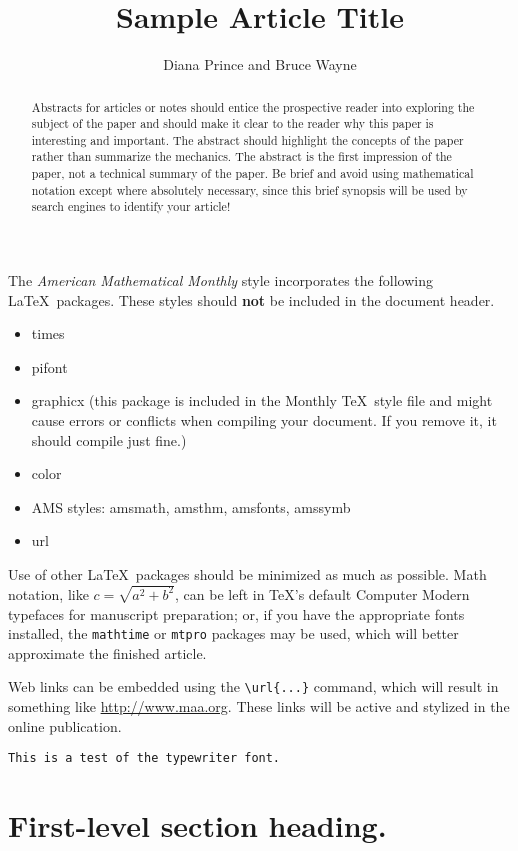 \documentclass{article}
\theoremstyle{plain}
\theoremstyle{definition}
\begin{document}
\title{Sample Article Title}
\author{Diana Prince and Bruce Wayne}

\maketitle


\begin{abstract}
Abstracts for articles or notes should entice the prospective reader into exploring the subject of the paper and should make it clear to the reader why this paper is interesting and important.  The abstract should highlight the concepts of the paper rather than summarize the mechanics.  The abstract is the first impression of the paper, not a technical summary of the paper. Be brief and avoid using mathematical notation except where absolutely necessary, since this brief synopsis will be used by search engines to identify your article!
\end{abstract}


\noindent
The \textit{American Mathematical Monthly} style incorporates the following \LaTeX\ packages.  These styles should \textbf{not} be included in the document header.
\begin{itemize}
\item times
\item pifont
\item graphicx (this package is included in the {\sc Monthly} \TeX\ style file and might cause errors or conflicts when compiling your document.  If you remove it, it should compile just fine.)
\item color
\item AMS styles: amsmath, amsthm, amsfonts, amssymb
\item url
\end{itemize}
Use of other \LaTeX\ packages should be minimized as much as possible. Math notation, like $c = \sqrt{a^2 +b^2}$, can be left in \TeX's default Computer Modern typefaces for manuscript preparation; or, if you have the appropriate fonts installed, the \texttt{mathtime} or \texttt{mtpro} packages may be used, which will better approximate the finished article.

Web links can be embedded using the \verb~\url{...}~ command, which will result in something like \url{http://www.maa.org}.  These links will be active and stylized in the online publication.

\texttt{This is a test of the typewriter font.}

\section{First-level section heading.}
\end{document}
